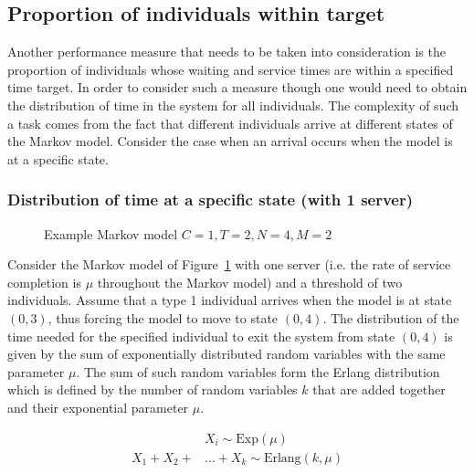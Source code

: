 \subsection{Proportion of individuals within target}
\label{sec:proportion_of_individuals_within_time}

Another performance measure that needs to be taken into consideration is the
proportion of individuals whose waiting and service times are within a
specified time target.
In order to consider such a measure though one would need to obtain the
distribution of time in the system for all individuals.
The complexity of such a task comes from the fact that different individuals
arrive at different states of the Markov model.
Consider the case when an arrival occurs when the model is at a specific state.

\subsubsection{Distribution of time at a specific state (with 1 server)}

\begin{figure}[H]
    \centering
    \scalebox{0.75}{}
    \caption{Example Markov model \(C=1, T=2, N=4, M=2\)}
    \label{fig:distribution_of_time_at_specific_state_1_server}
\end{figure}

Consider the Markov model of
Figure~\ref{fig:distribution_of_time_at_specific_state_1_server}
with one server (i.e.
the rate of service completion is \(\mu\) throughout the Markov model)
and a threshold of two individuals.
Assume that a type 1 individual arrives when the model is at state
\((0,3)\), thus forcing the model to move to state \((0,4)\).
The distribution of the time needed for the specified individual to exit the
system from state \((0,4)\) is given by the sum of exponentially distributed
random variables with the same parameter \(\mu\).
The sum of such random variables form the Erlang distribution which is defined
by the number of random variables \(k\) that are added together and their
exponential parameter \(\mu\).

\begin{align}
    & X_i \sim \text{Exp}(\mu) \nonumber \\
    X_1 + X_2 + & \dots + X_k \sim \text{Erlang}(k,\mu)
    \label{eq:erlang_distribution_definition}
\end{align}

